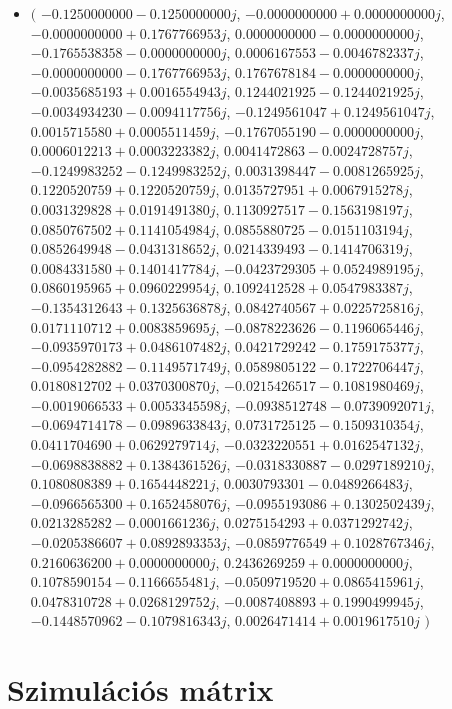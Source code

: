 \documentclass[14pt,a4paper]{article}
\begin{document}
\begin{itemize}
\item
$\big($
$-0.1250000000-0.1250000000j$, $-0.0000000000+0.0000000000j$, $-0.0000000000+0.1767766953j$, $0.0000000000-0.0000000000j$, $-0.1765538358-0.0000000000j$, $0.0006167553-0.0046782337j$, $-0.0000000000-0.1767766953j$, $0.1767678184-0.0000000000j$, $-0.0035685193+0.0016554943j$, $0.1244021925-0.1244021925j$, $-0.0034934230-0.0094117756j$, $-0.1249561047+0.1249561047j$, $0.0015715580+0.0005511459j$, $-0.1767055190-0.0000000000j$, $0.0006012213+0.0003223382j$, $0.0041472863-0.0024728757j$, $-0.1249983252-0.1249983252j$, $0.0031398447-0.0081265925j$, $0.1220520759+0.1220520759j$, $0.0135727951+0.0067915278j$, $0.0031329828+0.0191491380j$, $0.1130927517-0.1563198197j$, $0.0850767502+0.1141054984j$, $0.0855880725-0.0151103194j$, $0.0852649948-0.0431318652j$, $0.0214339493-0.1414706319j$, $0.0084331580+0.1401417784j$, $-0.0423729305+0.0524989195j$, $0.0860195965+0.0960229954j$, $0.1092412528+0.0547983387j$, $-0.1354312643+0.1325636878j$, $0.0842740567+0.0225725816j$, $0.0171110712+0.0083859695j$, $-0.0878223626-0.1196065446j$, $-0.0935970173+0.0486107482j$, $0.0421729242-0.1759175377j$, $-0.0954282882-0.1149571749j$, $0.0589805122-0.1722706447j$, $0.0180812702+0.0370300870j$, $-0.0215426517-0.1081980469j$, $-0.0019066533+0.0053345598j$, $-0.0938512748-0.0739092071j$, $-0.0694714178-0.0989633843j$, $0.0731725125-0.1509310354j$, $0.0411704690+0.0629279714j$, $-0.0323220551+0.0162547132j$, $-0.0698838882+0.1384361526j$, $-0.0318330887-0.0297189210j$, $0.1080808389+0.1654448221j$, $0.0030793301-0.0489266483j$, $-0.0966565300+0.1652458076j$, $-0.0955193086+0.1302502439j$, $0.0213285282-0.0001661236j$, $0.0275154293+0.0371292742j$, $-0.0205386607+0.0892893353j$, $-0.0859776549+0.1028767346j$, $0.2160636200+0.0000000000j$, $0.2436269259+0.0000000000j$, $0.1078590154-0.1166655481j$, $-0.0509719520+0.0865415961j$, $0.0478310728+0.0268129752j$, $-0.0087408893+0.1990499945j$, $-0.1448570962-0.1079816343j$, $0.0026471414+0.0019617510j$
$\big)$
\end{itemize}
\section{Szimulációs mátrix}
\end{document}
